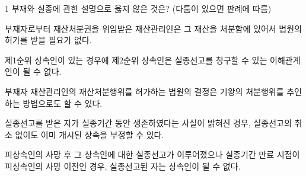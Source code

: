 \begin{question}{1}
부재와 실종에 관한 설명으로 옳지 않은 것은? (다툼이 있으면 판례에 따름)
\begin{choices}
  \item 부재자로부터 재산처분권을 위임받은 재산관리인은 그 재산을 처분함에 있어서 법원의 허가를 받을 필요가 없다.
  \item 제1순위 상속인이 있는 경우에 제2순위 상속인은 실종선고를 청구할 수 있는 이해관계인이 될 수 없다.
  \item 부재자 재산관리인의 재산처분행위를 허가하는 법원의 결정은 기왕의 처분행위를 추인하는 방법으로도 할 수 있다.
  \item 실종선고를 받은 자가 실종기간 동안 생존하였다는 사실이 밝혀진 경우, 실종선고의 취소 없이도 이미 개시된 상속을 부정할 수 있다.
  \item 피상속인의 사망 후 그 상속인에 대한 실종선고가 이루어졌으나 실종기간 만료 시점이 피상속인의 사망 이전인 경우, 실종선고된 자는 상속인이 될 수 없다.
\end{choices}
\end{question}
